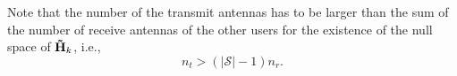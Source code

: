 \documentclass[journal,twoside]{IEEEtranTCOM}
\begin{document}


Note that the number of the transmit antennas has to be larger than the sum of the number of receive antennas of the other users for the existence of the null space of ${\bf{\tilde H}}_k$, i.e.,
\begin{equation} \label{eq:Kmax constraint}
{n_t>(|\mathcal{S}|-1)n_r}.
\end{equation}
\end{document}
